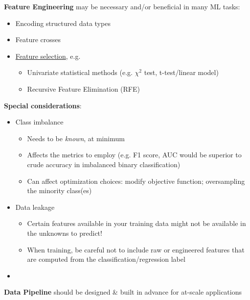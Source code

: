 \documentclass[10pt,landscape,letterpaper]{cheatsheet}
\begin{document}
\begin{multicols}{3}
\textbf{Feature Engineering} may be necessary and/or beneficial in many ML tasks:

\begin{itemize}
    \item Encoding structured data types
    \item Feature crosses
    \item \href{https://scikit-learn.org/stable/modules/feature_selection.html}{Feature selection}, e.g.
    \begin{itemize}
        \item Univariate statistical methods (e.g. $\chi^2$ test, t-test/linear model)
        \item Recursive Feature Elimination (RFE)
    \end{itemize}
\end{itemize}

\textbf{Special considerations}:

\begin{itemize}
    \item Class imbalance
    \begin{itemize}
        \item Needs to be \emph{known}, at minimum
        \item Affects the metrics to employ (e.g. F1 score, AUC would be superior to crude accuracy in imbalanced binary classification)
        \item Can affect optimization choices: modify objective function; oversampling the minority class(es)
    \end{itemize}
    \item Data leakage
    \begin{itemize}
        \item Certain features available in your training data might not be available in the unknowns to predict!
        \item When training, be careful not to include raw or engineered features that are computed from the classification/regression label
    \end{itemize}
    \item 
\end{itemize}

\textbf{Data Pipeline} should be designed \& built in advance for at-scale applications


\end{multicols}
\end{document}
